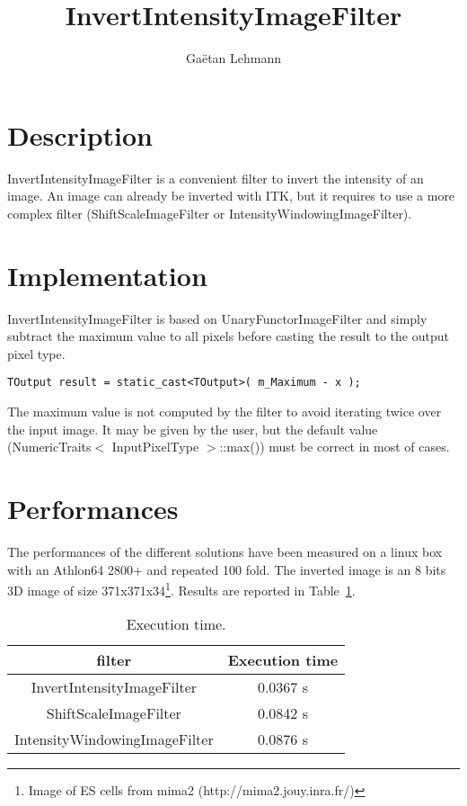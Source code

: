 \documentclass[IJ]{cesj}
\author{Ga\"etan Lehmann}
\institute{Biologie du d\'eveloppement et de la reproduction, INRA de Jouy-en-Josas}
\title{InvertIntensityImageFilter}
\begin{document}
\lstset{language=c++}
\maketitle

\section{Description}
InvertIntensityImageFilter is a convenient filter to invert the intensity of an image. An image can already be inverted with ITK, but it requires to use a more complex filter (ShiftScaleImageFilter or IntensityWindowingImageFilter).

\section{Implementation}
InvertIntensityImageFilter is based on UnaryFunctorImageFilter and simply subtract the maximum value to all pixels before casting the result to the output pixel type.
\begin{lstlisting}
TOutput result = static_cast<TOutput>( m_Maximum - x );
\end{lstlisting}
The maximum value is not computed by the filter to avoid iterating twice over the input image. It may be given by the user, but the default value (NumericTraits$<$ InputPixelType $>$::max()) must be correct in most of cases.
 
\section{Performances}
The performances of the different solutions have been measured on a linux box with an Athlon64 2800+ and repeated 100 fold. The inverted image is an 8 bits 3D image of size 371x371x34\footnote{Image of ES cells from mima2 (http://mima2.jouy.inra.fr/)}. Results are reported in Table~\ref{perf}.

\begin{table}
\centering
\begin{tabular}{cc}
\hline
filter & Execution time \\
\hline
\hline
InvertIntensityImageFilter & 0.0367 s \\
ShiftScaleImageFilter & 0.0842 s \\
IntensityWindowingImageFilter & 0.0876 s \\
\hline
\end{tabular}
\caption{Execution time.\label{perf}}
\end{table}
\end{document}
